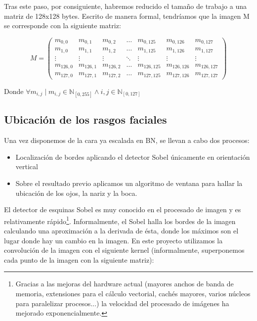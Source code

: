 Tras este paso, por consiguiente, habremos reducido el tamaño de trabajo a una matriz de 128x128 bytes. Escrito de manera formal, tendríamos que la imagen M se corresponde con la siguiente matriz:

\[ M=\left( \begin{array}{lcccccr} 
	m_{0,0} & m_{0,1} & m_{0,2} & \hdots & m_{0,125} & m_{0,126} & m_{0,127}\\
	m_{1,0} & m_{1,1} & m_{1,2} & \hdots & m_{1,125} & m_{1,126} & m_{1,127}\\
	\vdots & \vdots & \vdots & \ddots & \vdots & \vdots & \vdots \\
	m_{126,0} & m_{126,1} & m_{126,2} & \hdots & m_{126,125} & m_{126,126} & m_{126,127}\\
	m_{127,0} & m_{127,1} & m_{127,2} & \hdots & m_{127,125} & m_{127,126} & m_{127,127}
	\end{array} \right)
\]

Donde $ \forall m_{i,j} \mid m_{i,j} \in \mathbb{N}_{\left[ 0,255 \right]} \wedge i,j \in \mathbb{N}_{\left[ 0,127 \right]} $
	

\subsection{Ubicación de los rasgos faciales}
Una vez disponemos de la cara ya escalada en BN, se llevan a cabo dos procesos:
\begin{itemize}
	\item{Localización de bordes aplicando el detector Sobel únicamente en orientación vertical}
	\item{Sobre el resultado previo aplicamos un algoritmo de ventana para hallar la ubicación de los ojos, la nariz y la boca.}
\end{itemize}

El detector de esquinas Sobel es muy conocido en el procesado de imagen\cite{opencv} y es relativamente rápido\footnote{Gracias a las mejoras del hardware actual (mayores anchos de banda de memoria, extensiones para el cálculo vectorial, cachés mayores, varios núcleos para paralelizar procesos...) la velocidad del procesado de imágenes ha mejorado exponencialmente. }. Informalmente, el Sobel halla los bordes de la imagen calculando una aproximación a la derivada de ésta, donde los máximos son el lugar donde hay un cambio en la imagen. En este proyecto utilizamos la convolución de la imagen con el siguiente kernel (informalmente, superponemos cada punto de la imagen con la siguiente matriz):

